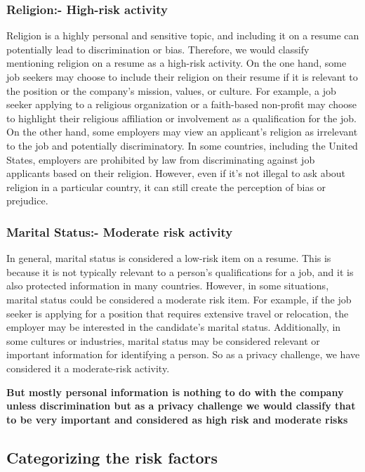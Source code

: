 \documentclass{article}
\begin{document}
\subsubsection{Religion:- High-risk activity
}

Religion is a highly personal and sensitive topic, and including it on a resume can potentially lead to discrimination or bias. Therefore, we would classify mentioning religion on a resume as a high-risk activity.
On the one hand, some job seekers may choose to include their religion on their resume if it is relevant to the position or the company's mission, values, or culture. For example, a job seeker applying to a religious organization or a faith-based non-profit may choose to highlight their religious affiliation or involvement as a qualification for the job.
On the other hand, some employers may view an applicant's religion as irrelevant to the job and potentially discriminatory. In some countries, including the United States, employers are prohibited by law from discriminating against job applicants based on their religion. However, even if it's not illegal to ask about religion in a particular country, it can still create the perception of bias or prejudice.

\subsubsection{Marital Status:- Moderate risk activity
}

In general, marital status is considered a low-risk item on a resume. This is because it is not typically relevant to a person's qualifications for a job, and it is also protected information in many countries. However, in some situations, marital status could be considered a moderate risk item. For example, if the job seeker is applying for a position that requires extensive travel or relocation, the employer may be interested in the candidate's marital status. Additionally, in some cultures or industries, marital status may be considered relevant or important information for identifying a person. So as a privacy challenge, we have considered it a moderate-risk activity.


\textbf{ But mostly personal information is nothing to do with the company unless discrimination but as a privacy challenge we would classify that to be very important and considered as high risk and moderate risks}

\subsection{Categorizing the risk factors}
\end{document}
